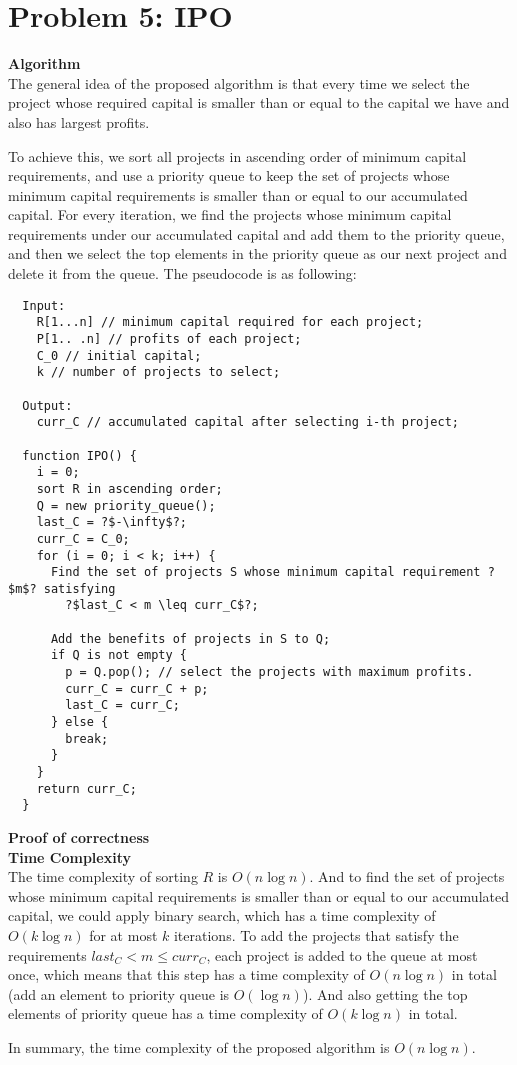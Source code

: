 \documentclass{article}
\newcommand{\Complexity}{\vspace{0.3cm} \noindent\textbf{Time Complexity} \vspace{0.2cm} \\}
\newcommand{\Proof}{\vspace{0.3cm} \noindent\textbf{Proof of correctness} \vspace{0.2cm} \\}
\newcommand{\Algorithm}{\textbf{Algorithm} \vspace{0.2cm}\\}
\begin{document}
\section*{Problem 5: IPO}

\Algorithm
The general idea of the proposed algorithm is that every time we select the project whose required
capital is smaller than or equal to the capital we have and also has largest profits. 

To achieve this, we sort all projects in ascending order of minimum capital requirements, and use a
priority queue to keep the set of projects whose minimum capital requirements is smaller than or
equal to our accumulated capital. For every iteration, we find the projects whose minimum capital
requirements under our accumulated capital and add them to the priority queue, and then we select the
top elements in the priority queue as our next project and delete it from the queue. The pseudocode is as following:

\begin{verbatim}
  Input:
    R[1...n] // minimum capital required for each project;
    P[1.. .n] // profits of each project;
    C_0 // initial capital;
    k // number of projects to select;
  
  Output:
    curr_C // accumulated capital after selecting i-th project;

  function IPO() {
    i = 0;
    sort R in ascending order;
    Q = new priority_queue();  
    last_C = ?$-\infty$?;
    curr_C = C_0;
    for (i = 0; i < k; i++) {
      Find the set of projects S whose minimum capital requirement ?$m$? satisfying 
        ?$last_C < m \leq curr_C$?;      
      
      Add the benefits of projects in S to Q;
      if Q is not empty {
        p = Q.pop(); // select the projects with maximum profits.
        curr_C = curr_C + p; 
        last_C = curr_C;
      } else {
        break;
      }
    }
    return curr_C;
  }
\end{verbatim}


\Proof



\Complexity
The time complexity of sorting $R$ is $O(n\log n)$. And to find the set of projects whose minimum
capital requirements is smaller than or equal to our accumulated capital, we could apply binary
search, which has a time complexity of $O(k\log n)$ for at most $k$ iterations. To add the projects
that satisfy the requirements $last_C < m \leq curr_C$, each project is added to the queue at most
once, which means that this step has a time complexity of $O(n\log n)$ in total (add an element to
priority queue is $O(\log n)$). And also getting the top elements of priority queue has a time
complexity of $O(k \log n)$ in total.

In summary, the time complexity of the proposed algorithm is $O(n\log n)$.
\end{document}
